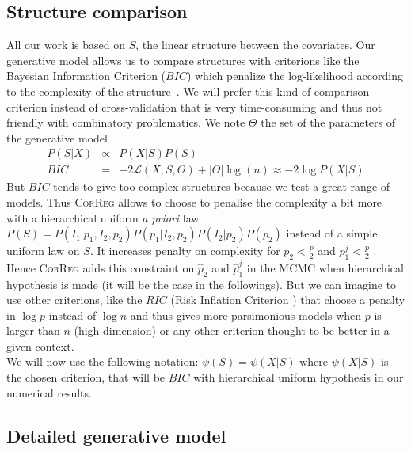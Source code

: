 \documentclass[11pt,a4paper]{article}
\begin{document}
	\subsection{Structure comparison} \label{compstruct}
  All our work is based on $S$, the linear structure between the covariates.
	Our generative model allows us to compare structures with criterions like the Bayesian Information Criterion ($BIC$) which penalize the log-likelihood according to the complexity of the structure~\cite{BIChuard}. We will prefer this kind of comparison criterion instead of cross-validation that is very time-consuming and thus not friendly with combinatory problematics.
	We note $\Theta$ the set of the parameters of the generative model
	\begin{eqnarray}
		P(S|X)&\propto& P(X|S)P(S) \\
		BIC&=&-2\mathcal{L}(X,S,\Theta)+|\Theta|\log(n) \approx -2\log P(X|S)
	\end{eqnarray}
	But $BIC$ tends to give too complex structures because we test a great range of models. 
	Thus \mbox{\textsc{CorReg}} allows to choose to penalise the complexity a bit more with a hierarchical uniform {\it a priori} law $P(S)=P(I_1 | p_1,I_2,p_2)P(p_1|I_2,p_2)P(I_2|p_2)P(p_2)$  instead of a simple uniform law on $S$.
	It increases penalty on complexity for $p_2<\frac{p}{2}$ and $p_1^j<\frac{p}{2}$ . Hence %
	\textsc{CorReg} adds this constraint on $\hat{p}_2$ and $\hat{p}_1^j$ in the MCMC when hierarchical hypothesis is made (it will be the case in the followings).			
	But we can imagine to use other criterions, like the $RIC$ (Risk Inflation Criterion \cite{foster1994risk}) that choose a penalty in $\log p$ instead of $\log n$ and thus gives more parsimonious models when $p$ is larger than $n$ (high dimension) or any other criterion \cite{george1993variable} thought to be better in a given context. 
\\	
	
		We will now use the following notation: $\psi(S)=\psi(X|S)$	where $\psi(X|S)$ is the chosen criterion, that will be $BIC$ with hierarchical uniform hypothesis in our numerical results.
\subsection{Detailed generative model}
		
\end{document}

